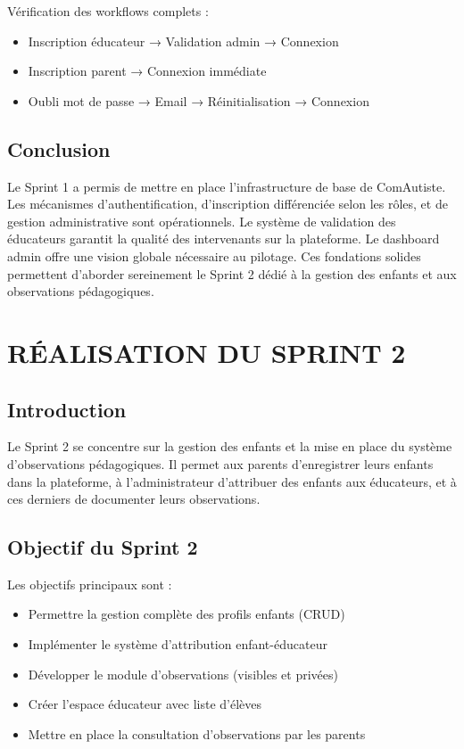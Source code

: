 \documentclass[12pt,a4paper]{report}
\begin{document}
Vérification des workflows complets :
\begin{itemize}
    \item Inscription éducateur → Validation admin → Connexion
    \item Inscription parent → Connexion immédiate
    \item Oubli mot de passe → Email → Réinitialisation → Connexion
\end{itemize}

\section{Conclusion}

Le Sprint 1 a permis de mettre en place l'infrastructure de base de ComAutiste. Les mécanismes d'authentification, d'inscription différenciée selon les rôles, et de gestion administrative sont opérationnels. Le système de validation des éducateurs garantit la qualité des intervenants sur la plateforme. Le dashboard admin offre une vision globale nécessaire au pilotage. Ces fondations solides permettent d'aborder sereinement le Sprint 2 dédié à la gestion des enfants et aux observations pédagogiques.

\newpage

\chapter{RÉALISATION DU SPRINT 2}

\section{Introduction}

Le Sprint 2 se concentre sur la gestion des enfants et la mise en place du système d'observations pédagogiques. Il permet aux parents d'enregistrer leurs enfants dans la plateforme, à l'administrateur d'attribuer des enfants aux éducateurs, et à ces derniers de documenter leurs observations.

\section{Objectif du Sprint 2}

Les objectifs principaux sont :
\begin{itemize} 
    \item Permettre la gestion complète des profils enfants (CRUD)
    \item Implémenter le système d'attribution enfant-éducateur
    \item Développer le module d'observations (visibles et privées)
    \item Créer l'espace éducateur avec liste d'élèves
    \item Mettre en place la consultation d'observations par les parents
\end{itemize}
\end{document}
